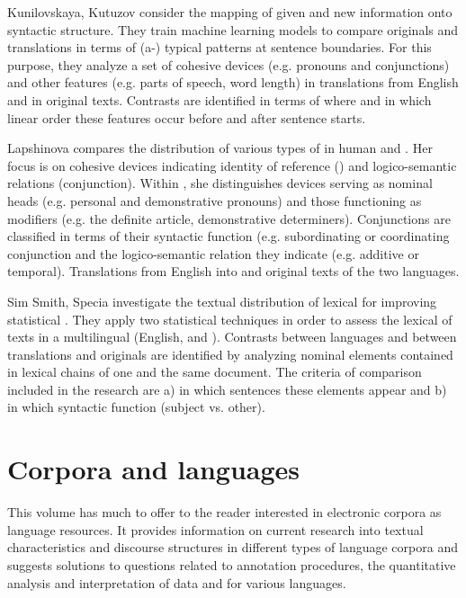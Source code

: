 \documentclass[output=paper]{langsci/langscibook.cls}
\begin{document}
Kunilovskaya, Kutuzov consider the mapping of given and new information onto syntactic structure. They train machine learning models to compare originals and translations in terms of (a-) typical patterns at sentence boundaries. For this purpose, they analyze a set of cohesive devices (e.g. pronouns and conjunctions) and other features (e.g. parts of speech, word length) in  translations from English and in  original texts. Contrasts are identified in terms of where and in which linear order these features occur before and after sentence starts. 

Lapshinova compares the distribution of various types of  in human and . Her focus is on cohesive devices indicating identity of reference () and logico-semantic relations (conjunction). Within , she distinguishes devices serving as nominal heads (e.g. personal and demonstrative pronouns) and those functioning as modifiers (e.g. the definite article, demonstrative determiners). Conjunctions are classified in terms of their syntactic function (e.g. subordinating or coordinating conjunction and the logico-semantic relation they indicate (e.g. additive or temporal). Translations from English into  and original texts of the two languages. 

Sim Smith, Specia investigate the textual distribution of lexical  for improving statistical . They apply two statistical techniques in order to assess the lexical  of texts in a multilingual  (English,  and ). Contrasts between languages and between translations and originals are identified by analyzing nominal elements contained in lexical chains of one and the same document. The criteria of comparison included in the research are a) in which sentences these elements appear and b) in which syntactic function (subject vs. other).
	
	\section{Corpora and languages}
	This volume has much to offer to the reader interested in electronic corpora as language resources. It provides information on current research into textual characteristics and discourse structures in different types of language corpora and suggests solutions to questions related to annotation procedures, the quantitative analysis and interpretation of data and  for various languages.
	
\end{document}
